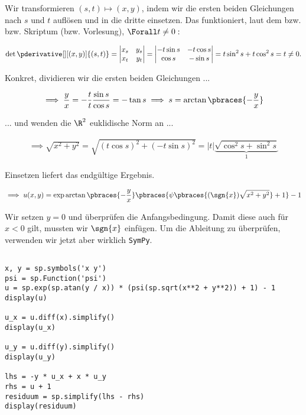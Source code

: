 \begin{solution}
Wir transformieren $(s, t) \mapsto (x, y)$, indem wir die ersten beiden Gleichungen nach $s$ und $t$ auflösen und in die dritte einsetzen.
Das funktioniert, laut dem  bzw.  bzw. Skriptum (bzw. Vorlesung), $\Forall t \neq 0:$

\begin{align*}
    \det \pderivative[][(x, y)]{(s, t)}
    =
    \begin{vmatrix}
        x_s & y_s \\
        x_t & y_t
    \end{vmatrix}
    =
    \begin{vmatrix}
        -t \sin{s} & -t \cos{s} \\
        \cos{s}    & -\sin{s}
    \end{vmatrix}
    =
    t \sin^2{s} + t \cos^2{s}
    =
    t \neq 0.
\end{align*}

Konkret, dividieren wir die ersten beiden Gleichungen ...

\begin{align*}
    \implies
    \frac{y}{x}
    =
    -\frac{t}{t} \frac{\sin{s}}{\cos{s}}
    =
    -\tan{s}
    \implies
    s = \arctan
    {
        \pbraces{-\frac{y}{x}}
    }
\end{align*}

... und wenden die $\R^2$ euklidische Norm an ...

\begin{align*}
    \implies
    \sqrt{x^2 + y ^2}
    =
    \sqrt
    {
        (t \cos{s})^2
        +
        (-t \sin{s})^2
    }
    =
    |t|
    \underbrace
    {
        \sqrt
        {
            \cos^2{s}
            +
            \sin^2{s}
        }
    }_1
\end{align*}

Einsetzen liefert das endgültige Ergebnis.

\begin{align*}
    \implies
    u(x, y)
    =
    \exp \arctan \pbraces
    {
        -\frac{y}{x}
    }
    \pbraces
    {
        \psi \pbraces
        {
            (\sgn{x})
            \sqrt{x^2 + y^2}
        } + 1
    } - 1
\end{align*}

Wir setzen $y = 0$ und überprüfen die Anfangsbedingung.
Damit diese auch für $x < 0$ gilt, mussten wir $\sgn{x}$ einfügen.
Um die Ableitung zu überprüfen, verwenden wir jetzt aber wirklich \verb|SymPy|.

\begin{lstlisting}
    
x, y = sp.symbols('x y')
psi = sp.Function('psi')
u = sp.exp(sp.atan(y / x)) * (psi(sp.sqrt(x**2 + y**2)) + 1) - 1
display(u)

u_x = u.diff(x).simplify()
display(u_x)

u_y = u.diff(y).simplify()
display(u_y)

lhs = -y * u_x + x * u_y
rhs = u + 1
residuum = sp.simplify(lhs - rhs)
display(residuum)

\end{lstlisting}

\end{solution}

